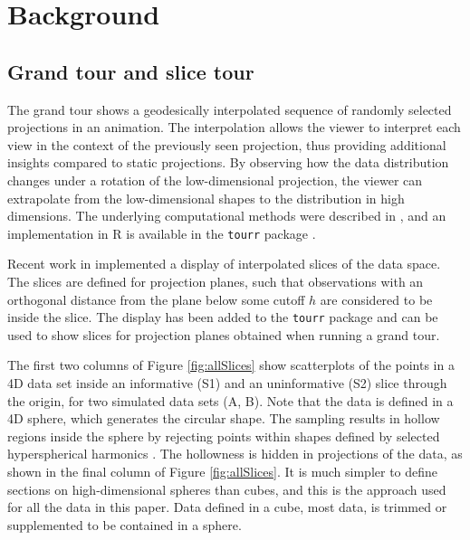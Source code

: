 \documentclass[]{interact}
\theoremstyle{plain}%
\theoremstyle{definition}
\theoremstyle{remark}
\begin{document}
\hypertarget{background}{%
\section{\texorpdfstring{Background
\label{sec:background}}{Background }}\label{background}}

\hypertarget{grand-tour-and-slice-tour}{%
\subsection{Grand tour and slice tour}\label{grand-tour-and-slice-tour}}

The grand tour shows a geodesically interpolated sequence of randomly
selected projections in an animation. The interpolation allows the
viewer to interpret each view in the context of the previously seen
projection, thus providing additional insights compared to static
projections. By observing how the data distribution changes under a
rotation of the low-dimensional projection, the viewer can extrapolate
from the low-dimensional shapes to the distribution in high dimensions.
The underlying computational methods were described in \citet{BCAH05},
and an implementation in R \citep{rlang} is available in the
\texttt{tourr} package \citep{tourr}.

Recent work in \citet{laa2019slice} implemented a display of
interpolated slices of the data space. The slices are defined for
projection planes, such that observations with an orthogonal distance
from the plane below some cutoff \(h\) are considered to be inside the
slice. The display has been added to the \texttt{tourr} package and can
be used to show slices for projection planes obtained when running a
grand tour.

The first two columns of Figure \ref{fig:allSlices} show scatterplots of
the points in a 4D data set inside an informative (S1) and an
uninformative (S2) slice through the origin, for two simulated data sets
(A, B). Note that the data is defined in a 4D sphere, which generates
the circular shape. The sampling results in hollow regions inside the
sphere by rejecting points within shapes defined by selected
hyperspherical harmonics \citep{doi:10.1063/1.3054274}. The hollowness
is hidden in projections of the data, as shown in the final column of
Figure \ref{fig:allSlices}. It is much simpler to define sections on
high-dimensional spheres than cubes, and this is the approach used for
all the data in this paper. Data defined in a cube, most data, is
trimmed or supplemented to be contained in a sphere.
\end{document}
